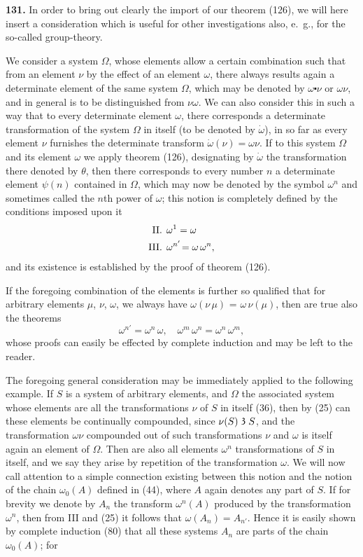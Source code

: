 \documentclass[oneside]{book}
\newcommand\partof{\mathrel{\raisebox{0.45ex}{$\mathfrak{3}$}}}   %
\newcommand\mypara{\medskip\textbf}
\begin{document}
\mypara{131.} In order to bring out clearly the import of
our theorem (126), we will here insert a consideration
which is useful for other investigations also, e.~g., for
the so-called group-theory.

We consider a system $\Omega$, whose elements allow a
certain combination such that from an element $\nu$ by
the effect of an element $\omega$, there always results again a
determinate element of the same system $\Omega$, which may
be denoted by $\omega\centerdot \nu$  or $\omega\nu$, and in general is to be distinguished
from $\nu\omega$. We can also consider this in
such a way that to every determinate element $\omega$, there
corresponds a determinate transformation of the system
$\Omega$ in itself (to be denoted by $\dot{\omega}$), in so far as every
element $\nu$ furnishes the determinate transform $\dot{\omega}(\nu)=
\omega \nu$.  If to this system $\Omega$ and its element $\omega$ we apply
theorem (126), designating by $\dot{\omega}$ the transformation
there denoted by $\theta$, then there corresponds to every
number $n$ a determinate element $\psi(n)$ contained in $\Omega$,
which may now be denoted by the symbol $\omega^n$ and sometimes
called the $n$th power of $\omega$; this notion is completely
defined by the conditions imposed upon it
\begin{align*}
\text{II\@. }& \omega^1 = \omega\\
\text{III\@. }& \omega^{n'}\! = \omega\, \omega^n,
\end{align*}
and its existence is established by the proof of theorem
(126).


If the foregoing combination of the elements is
further so qualified that for arbitrary elements $\mu$, $\nu$,
$\omega$, we always have $\omega(\nu\,\mu)$ = $\omega\,\nu(\mu)$, then are true also
the theorems
\[
  \omega^{n'}\! = \omega^n\, \omega, \quad
  \omega^m\, \omega^n = \omega^n\, \omega^m,
\]
whose proofs can easily be effected by complete induction
and may be left to the reader.

The foregoing general consideration may be immediately
applied to the following example. If $S$ is
a system of arbitrary elements, and $\Omega$ the associated
system whose elements are all the transformations $\nu$ of
$S$ in itself (36), then by (25) can these elements be continually
compounded, since $\nu(S) \partof S$, and the transformation
$\omega\nu$ compounded out of such transformations $\nu$
and $\omega$ is itself again an element of $\Omega$. Then are also
all elements $\omega^n$ transformations of $S$ in itself, and we
say they arise by repetition of the transformation $\omega$.
We will now call attention to a simple connection existing
between this notion and the notion of the chain
$\omega_0(A)$ defined in (44), where $A$ again denotes any part
of $S$. If for brevity we denote by $A_n$ the transform
$\omega^n(A)$ produced by the transformation $\omega^n$, then from
III and (25) it follows that $\omega(A_n)=A_{n'}$. Hence it is
easily shown by complete induction (80) that all these
systems $A_n$ are parts of the chain $\omega_0(A)$; for
\end{document}
